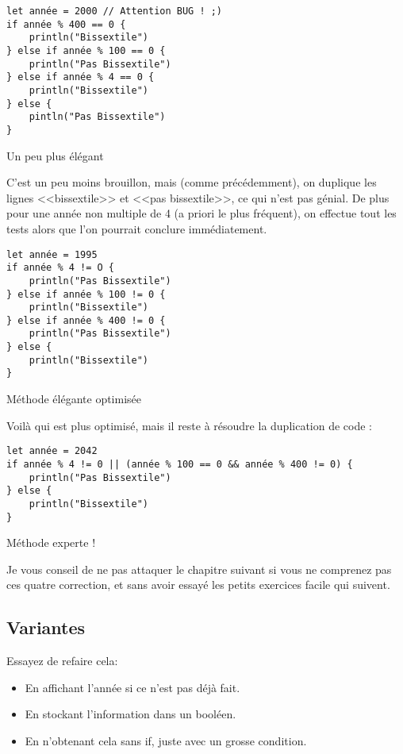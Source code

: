 \begin{listing}[h!]
\begin{verbatim}
let année = 2000 // Attention BUG ! ;)
if année % 400 == 0 {
    println("Bissextile")
} else if année % 100 == 0 {
    println("Pas Bissextile")
} else if année % 4 == 0 {
    println("Bissextile")
} else {
    pintln("Pas Bissextile")
}
\end{verbatim}
\caption{Un peu plus élégant}
\end{listing}
C'est un peu moins brouillon, mais (comme précédemment), on duplique les lignes <<bissextile>> et <<pas bissextile>>, ce qui n'est pas génial. De plus pour une année non multiple de 4 (a priori le plus fréquent), on effectue tout les tests alors que l'on pourrait conclure immédiatement.

\begin{listing}[h!]
\begin{verbatim}
let année = 1995
if année % 4 != O {
    println("Pas Bissextile")
} else if année % 100 != 0 {
    println("Bissextile")
} else if année % 400 != 0 {
    println("Pas Bissextile")
} else {
    println("Bissextile")
}
\end{verbatim}
\caption{Méthode élégante optimisée}
\end{listing}
Voilà qui est plus optimisé, mais il reste à résoudre la duplication de code :

\begin{listing}[h!]
\begin{verbatim}
let année = 2042
if année % 4 != 0 || (année % 100 == 0 && année % 400 != 0) {
    println("Pas Bissextile")
} else {
    println("Bissextile")
}
\end{verbatim}
\caption{Méthode experte !}
\end{listing}

Je vous conseil de ne pas attaquer le chapitre suivant
si vous ne comprenez pas ces quatre correction,
et sans avoir essayé les petits exercices facile qui suivent.
\subsection{Variantes}
Essayez de refaire cela:
\begin{itemize}

\item En affichant l'année si ce n'est pas déjà fait.
\item En stockant l'information dans un booléen.
\item En n'obtenant cela sans if, juste avec un grosse condition.

\end{itemize}
